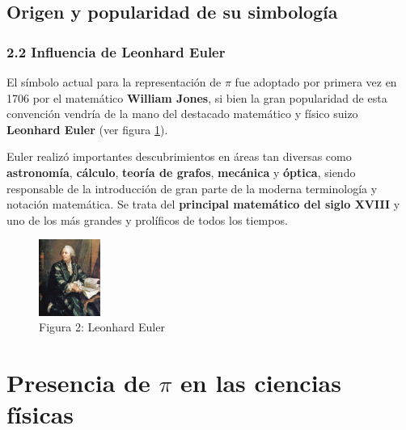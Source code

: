 \documentclass{beamer}
\begin{document}
\subsection{Origen y popularidad de su simbología}
\begin{frame}
\frametitle{2.2 Influencia de Leonhard Euler}

El símbolo actual para la representación de $\pi$ fue adoptado por primera vez en 1706 
por el matemático \textbf{William Jones}, si bien la gran popularidad de esta convención 
vendría de la mano del destacado matemático y físico suizo \textbf{Leonhard Euler} (ver 
figura \ref{euler}). \par \pause Euler realizó importantes descubrimientos en áreas tan 
diversas como \textbf{astronomía}, \textbf{cálculo}, \textbf{teoría de grafos}, \textbf{mecánica} 
y \textbf{óptica}, siendo responsable de la introducción de gran parte de la moderna terminología 
y notación matemática. Se trata del \textbf{principal matemático del siglo XVIII} y uno de los 
más grandes y prolíficos de todos los tiempos. \pause

\begin{figure}[!th]
\begin{center}\includegraphics[height=2.5cm, width=2cm]{img/euler.eps}
\caption{Figura 2: Leonhard Euler}
\label{euler}
\end{center}
\end{figure}

\end{frame}


\section{Presencia de $\pi$ en las ciencias físicas}

\end{document}
